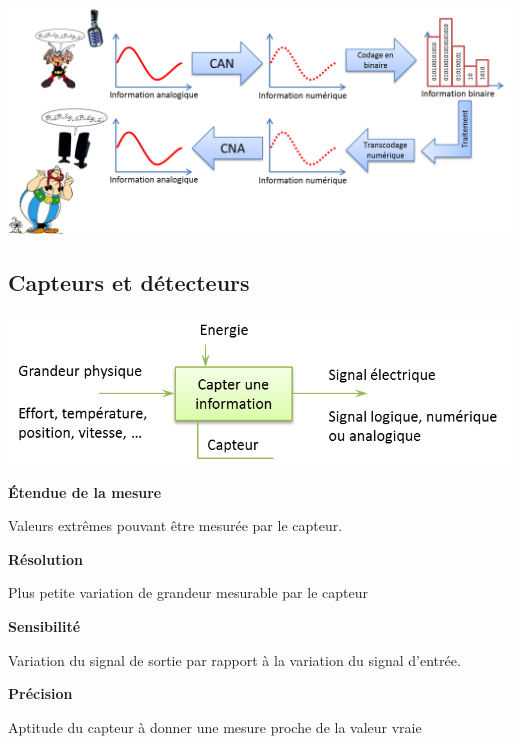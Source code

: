 \documentclass[10pt]{article}
\begin{document}

\begin{exemple}
  \begin{center}
    \includegraphics[width=.9\textwidth]{images/info}
  \end{center}
\end{exemple}

\subsection{Capteurs et détecteurs \cite{cbissprof}}

\begin{center}
    \includegraphics[width=.55\textwidth]{images/capteur}
\end{center}

\begin{defi}
\textbf{\'Etendue de la mesure}

Valeurs extrêmes pouvant être mesurée par le capteur.
\end{defi}

\begin{defi}
\textbf{Résolution}

Plus petite variation de grandeur mesurable par le capteur
\end{defi}


\begin{defi}
\textbf{Sensibilité}

Variation du signal de sortie par rapport à la variation du signal d'entrée.
\end{defi}


\begin{defi}
\textbf{Précision}

Aptitude du capteur à donner une mesure proche de la valeur vraie
\end{defi}
\end{document}
